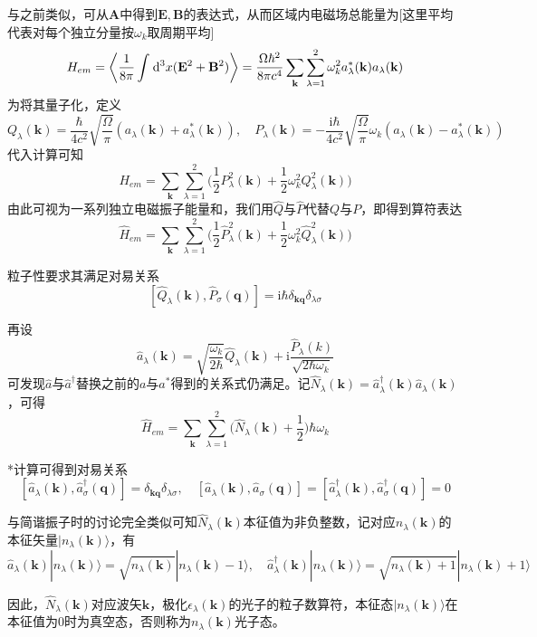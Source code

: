\documentclass[a4paper,UTF8,fontset=windows]{ctexart}
\newcommand*{\dr}{\hspace{0.07em}\mathrm{d}}
\newcommand*{\ir}{\mathrm{i}}
\newcommand*{\ket}[1]{|#1\rangle}
\begin{document}
与之前类似，可从$\mathbf{A}$中得到$\mathbf{E},\mathbf{B}$的表达式，从而区域内电磁场总能量为[这里平均代表对每个独立分量按$\omega_k$取周期平均]
$$H_{em}=\left<\frac{1}{8\pi}\int\dr^3x(\mathbf{E}^2+\mathbf{B}^2)\right>=\frac{\Omega\hbar^2}{8\pi c^4}\sum_\mathbf{k}\sum_{\lambda=1}^2\omega_k^2a_\lambda^*(\mathbf{k})a_\lambda(\mathbf{k})$$
为将其量子化，定义
$$Q_\lambda(\mathbf{k})=\frac{\hbar}{4c^2}\sqrt{\frac{\Omega}{\pi}}(a_\lambda(\mathbf{k})+a_\lambda^*(\mathbf{k})),\quad P_\lambda(\mathbf{k})=-\frac{\ir\hbar}{4c^2}\sqrt{\frac{\Omega}{\pi}}\omega_k(a_\lambda(\mathbf{k})-a_\lambda^*(\mathbf{k}))$$
代入计算可知
$$H_{em}=\sum_\mathbf{k}\sum_{\lambda=1}^2\bigg(\frac{1}{2}P_\lambda^2(\mathbf{k})+\frac{1}{2}\omega_k^2Q_\lambda^2(\mathbf{k})\bigg)$$
由此可视为一系列独立电磁振子能量和，我们用$\hat{Q}$与$\hat{P}$代替$Q$与$P$，即得到算符表达
$$\hat{H}_{em}=\sum_\mathbf{k}\sum_{\lambda=1}^2\bigg(\frac{1}{2}\hat{P}_\lambda^2(\mathbf{k})+\frac{1}{2}\omega_k^2\hat{Q}_\lambda^2(\mathbf{k})\bigg)$$

粒子性要求其满足对易关系
$$[\hat{Q}_\lambda(\mathbf{k}),\hat{P}_\sigma(\mathbf{q})]=\ir\hbar\delta_{\mathbf{k}\mathbf{q}}\delta_{\lambda\sigma}$$

再设
$$\hat{a}_\lambda(\mathbf{k})=\sqrt{\frac{\omega_k}{2\hbar}}\hat{Q}_\lambda(\mathbf{k})+\ir\frac{\hat{P}_\lambda(k)}{\sqrt{2\hbar\omega_k}}$$
可发现$\hat{a}$与$\hat{a}^\dagger$替换之前的$a$与$a^*$得到的关系式仍满足。记$\hat{N}_\lambda(\mathbf{k})=\hat{a}_\lambda^\dagger(\mathbf{k})\hat{a}_\lambda(\mathbf{k})$，可得
$$\hat{H}_{em}=\sum_{\mathbf{k}}\sum_{\lambda=1}^2\bigg(\hat{N}_\lambda(\mathbf{k})+\frac{1}{2}\bigg)\hbar\omega_k$$

*计算可得到对易关系
$$[\hat{a}_\lambda(\mathbf{k}),\hat{a}_\sigma^\dagger(\mathbf{q})]=\delta_{\mathbf{k}\mathbf{q}}\delta_{\lambda\sigma},\quad[\hat{a}_\lambda(\mathbf{k}),\hat{a}_\sigma(\mathbf{q})]=[\hat{a}_\lambda^\dagger(\mathbf{k}),\hat{a}_\sigma^\dagger(\mathbf{q})]=0$$

与简谐振子时的讨论完全类似可知$\hat{N}_\lambda(\mathbf{k})$本征值为非负整数，记对应$n_\lambda(\mathbf{k})$的本征矢量$\ket{n_\lambda(\mathbf{k})}$，有
$$\hat{a}_\lambda(\mathbf{k})\ket{n_\lambda(\mathbf{k})}=\sqrt{n_\lambda(\mathbf{k})}\ket{n_\lambda(\mathbf{k})-1},\quad\hat{a}_\lambda^\dagger(\mathbf{k})\ket{n_\lambda(\mathbf{k})}=\sqrt{n_\lambda(\mathbf{k})+1}\ket{n_\lambda(\mathbf{k})+1}$$

因此，$\hat{N}_\lambda(\mathbf{k})$对应波矢$\mathbf{k}$，极化$\epsilon_\lambda(\mathbf{k})$的光子的粒子数算符，本征态$\ket{n_\lambda(\mathbf{k})}$在本征值为0时为真空态，否则称为$n_\lambda(\mathbf{k})$光子态。
\end{document}
